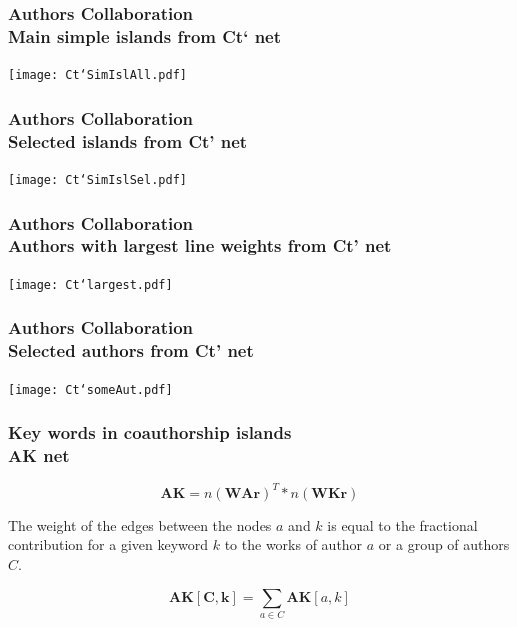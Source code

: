 \documentclass[hyperref={pdfstartview={FitBH -32768},
                         pdfpagemode=FullScreen,
                         plainpages=false,
                         colorlinks=true}
              ]{beamer}
\begin{document}
\begin{frame}[fragile]
\frametitle{Authors Collaboration \\ \normalsize Main simple islands from Ct` net}

\begin{center}
\texttt{[image: Ct`SimIslAll.pdf]}
\end{center}


\end{frame}

\begin{frame}[fragile]
\frametitle{Authors Collaboration \\ \normalsize Selected islands from Ct' net}

\begin{center}
\texttt{[image: Ct`SimIslSel.pdf]}
\end{center}

\end{frame}

\begin{frame}[fragile]
\frametitle{Authors Collaboration \\ \normalsize Authors with largest line weights from Ct' net}

\begin{center}
\texttt{[image: Ct`largest.pdf]}
\end{center}

\end{frame}

\begin{frame}[fragile]
\frametitle{Authors Collaboration \\ \normalsize Selected authors from Ct' net}

\begin{center}
\texttt{[image: Ct`someAut.pdf]}
\end{center}

\end{frame}


\begin{frame}[fragile]
\frametitle{Key words in coauthorship islands \\ \normalsize AK net}

\[ \mathbf{AK} = n(\mathbf{WAr}) ^ T * n(\mathbf{WKr}) \] \medskip

The  weight of the edges between the nodes $a$ and $k$  is equal to the fractional contribution for a given keyword $k$ to the works of author $a$ or a group of authors $C$. 


\[ \mathbf{AK[C,k]} = \sum_{a \in C}\mathbf{AK}[a,k] \] 

\end{frame}
\end{document}
